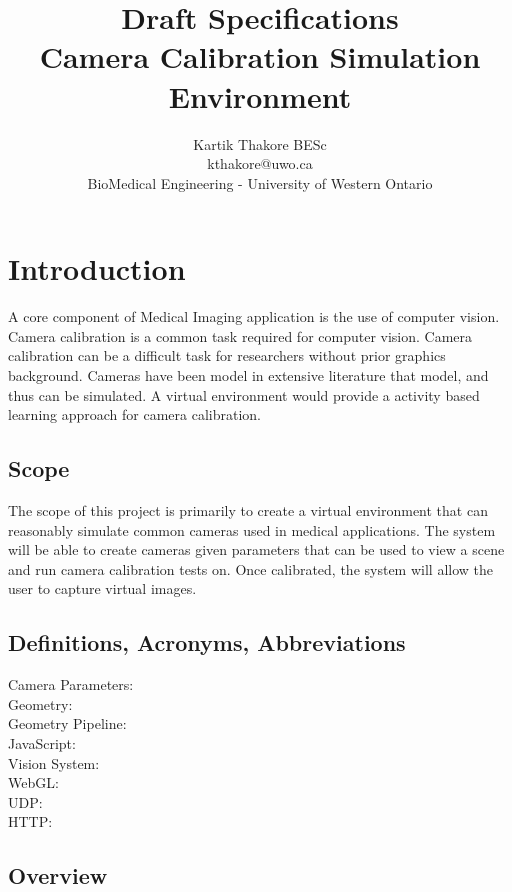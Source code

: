 \documentclass[11pt]{book}
\title{Draft Specifications\\Camera Calibration Simulation Environment}
\author{Kartik Thakore BESc\\
		kthakore@uwo.ca\\
		BioMedical Engineering - University of Western Ontario}
\date{}
\begin{document}
\maketitle

\chapter{Introduction}

A core component of Medical Imaging application is the use of computer vision. Camera calibration is a common task required for computer vision. Camera calibration can be a difficult task for researchers without prior graphics background. Cameras have been model in extensive literature that model, and thus can be simulated. A virtual environment would provide a activity based learning approach for camera calibration. 


\section{Scope}
The scope of this project is primarily to create a virtual environment that can reasonably simulate common cameras used in medical applications. The system will be able to create cameras given parameters that can be used to view a scene and run camera calibration tests on. Once calibrated, the system will allow the user to capture virtual images. 

\section{Definitions, Acronyms, Abbreviations}

\begin{description}
\item[ Camera Parameters: ]
\item[ Geometry: ]
\item[ Geometry Pipeline: ]
\item[ JavaScript: ]
\item[ Vision System: ]
\item[ WebGL: ]
\item[ UDP: ]
\item[ HTTP: ]

\end{description} 

\section{Overview}
\end{document}
